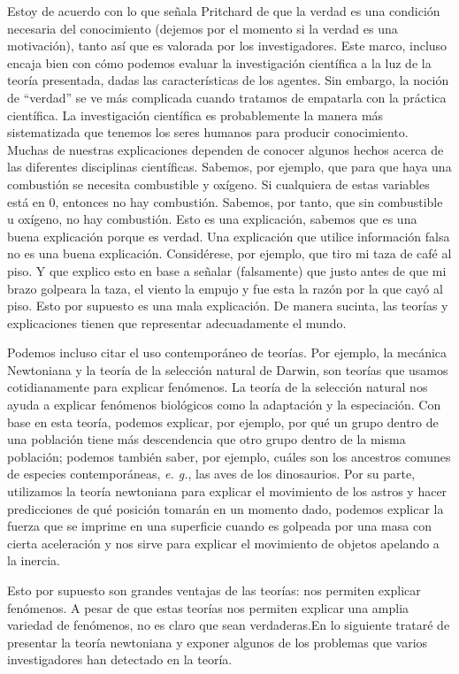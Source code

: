 \documentclass[12pt]{article}
\begin{document}
Estoy de acuerdo con lo que señala Pritchard de que la verdad es una condición necesaria del conocimiento (dejemos por el momento si la verdad es una motivación), tanto así que es valorada por los investigadores. Este marco, incluso encaja bien con cómo podemos evaluar la investigación científica a la luz de la teoría presentada, dadas las características de los agentes. Sin embargo, la noción de ``verdad'' se ve más complicada cuando tratamos de empatarla con la práctica científica. La investigación científica es probablemente la manera más sistematizada que tenemos los seres humanos para producir conocimiento. Muchas de nuestras explicaciones dependen de conocer algunos hechos acerca de las diferentes disciplinas científicas. Sabemos, por ejemplo, que para que haya una combustión se necesita combustible y oxígeno. Si cualquiera de estas variables está en 0, entonces no hay combustión. Sabemos, por tanto, que sin combustible u oxígeno, no hay combustión. Esto es una explicación, sabemos que es una buena explicación porque es verdad. Una explicación que utilice información falsa no es una buena explicación. Considérese, por ejemplo, que tiro mi taza de café al piso. Y que explico esto en base a señalar (falsamente) que justo antes de que mi brazo golpeara la taza, el viento la empujo y fue esta la razón por la que cayó al piso. Esto por supuesto es una mala explicación. De manera sucinta, las teorías y explicaciones tienen que representar adecuadamente el mundo.

Podemos incluso citar el uso contemporáneo de teorías. Por ejemplo, la mecánica Newtoniana y la teoría de la selección natural de Darwin, son teorías que usamos cotidianamente para explicar fenómenos. La teoría de la selección natural nos ayuda a explicar fenómenos biológicos como la adaptación y la especiación. Con base en esta teoría, podemos explicar, por ejemplo, por qué un grupo dentro de una población tiene más descendencia que otro grupo dentro de la misma población; podemos también saber, por ejemplo, cuáles son los ancestros comunes de especies contemporáneas, \textit{e. g.}, las aves de los dinosaurios. Por su parte, utilizamos la teoría newtoniana para explicar el movimiento de los astros y hacer predicciones de qué posición tomarán en un momento dado, podemos explicar la fuerza que se imprime en una superficie cuando es golpeada por una masa con cierta aceleración y nos sirve para explicar el movimiento de objetos apelando a la inercia.

Esto por supuesto son grandes ventajas de las teorías: nos permiten explicar fenómenos. A pesar de que estas teorías nos permiten explicar una amplia variedad de fenómenos, no es claro que sean verdaderas.En lo siguiente trataré de presentar la teoría newtoniana y exponer algunos de los problemas que varios investigadores han detectado en la teoría.
\end{document}
